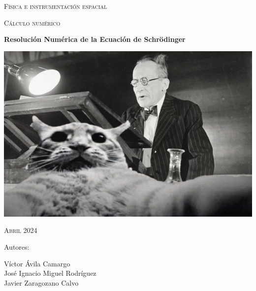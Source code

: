 \documentclass{article}
\begin{document}
	
	
	
	\begin{titlepage}
		\begin{center}
		{\scshape\huge Física e instrumentación espacial \par}
		\vspace{1cm}
		{\scshape\Large Cálculo numérico \par}
		\vspace{1cm}
		{\textbf{{\Huge Resolución Numérica de la Ecuación de Schrödinger}} \par}
		\vspace{1.5cm}
		{\includegraphics[scale=0.8]{portada}\par}
		\vspace{1cm}
		{\scshape\Large Abril 2024 \par}
		\vspace{1.5cm}
		\end{center}
		\begin{flushleft}
		{\Large Autores: \par}
		{\Large 
				Víctor Ávila Camargo\\
				José Ignacio Miguel Rodríguez\\
				Javier Zaragozano Calvo \par
		}
		\end{flushleft}
		\end{titlepage}
		
	\tableofcontents
	\newpage	
	
\end{document}
